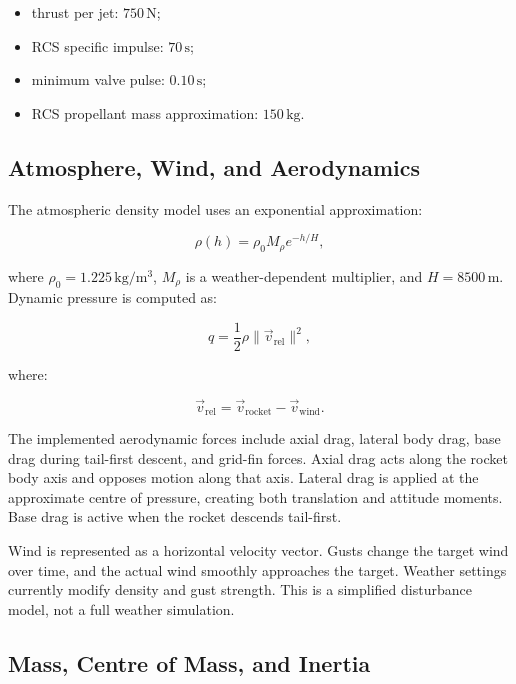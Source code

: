\documentclass{article}
\begin{document}
\begin{itemize}
    \item thrust per jet: \(750\,\mathrm{N}\);
    \item RCS specific impulse: \(70\,\mathrm{s}\);
    \item minimum valve pulse: \(0.10\,\mathrm{s}\);
    \item RCS propellant mass approximation: \(150\,\mathrm{kg}\).
\end{itemize}

\subsection{Atmosphere, Wind, and Aerodynamics}

The atmospheric density model uses an exponential approximation:

\begin{equation}
\rho(h) = \rho_0M_{\rho}e^{-h/H},
\end{equation}

where \(\rho_0 = 1.225\,\mathrm{kg/m^3}\), \(M_{\rho}\) is a weather-dependent multiplier, and \(H = 8500\,\mathrm{m}\). Dynamic pressure is computed as:

\begin{equation}
q = \frac{1}{2}\rho \|\vec{v}_{\mathrm{rel}}\|^2,
\end{equation}

where:

\begin{equation}
\vec{v}_{\mathrm{rel}} = \vec{v}_{\mathrm{rocket}} - \vec{v}_{\mathrm{wind}}.
\end{equation}

The implemented aerodynamic forces include axial drag, lateral body drag, base drag during tail-first descent, and grid-fin forces. Axial drag acts along the rocket body axis and opposes motion along that axis. Lateral drag is applied at the approximate centre of pressure, creating both translation and attitude moments. Base drag is active when the rocket descends tail-first.

Wind is represented as a horizontal velocity vector. Gusts change the target wind over time, and the actual wind smoothly approaches the target. Weather settings currently modify density and gust strength. This is a simplified disturbance model, not a full weather simulation.

\subsection{Mass, Centre of Mass, and Inertia}
\end{document}
